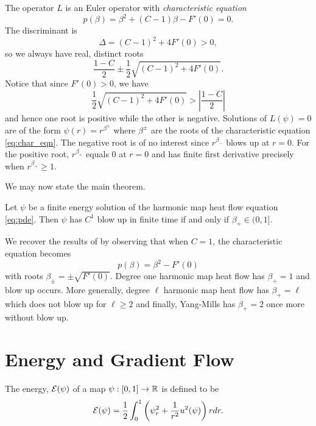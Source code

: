 \documentclass{amsart}
\begin{document}
The operator \(L\) is an Euler operator with \emph{characteristic equation}
\begin{equation}
\label{eq:char_eqn}
p(\beta) = \beta^2 + (C-1) \beta - F'(0) = 0.
\end{equation}
The discriminant is
\[
\Delta = (C-1)^2 + 4 F'(0) > 0,
\]
so we always have real, distinct roots
\[
\frac{1 - C}{2} \pm \frac{1}{2} \sqrt{(C-1)^2 + 4 F'(0)}.
\]
Notice that since \(F'(0) > 0\), we have
\[
\frac{1}{2} \sqrt{(C-1)^2 + 4 F'(0)} > \left|\frac{1-C}{2}\right|
\]
and hence one root is positive while the other is negative. Solutions of \(L(\psi) = 0\) are of the form \(\psi(r) = r^{\beta^{\pm}}\) where \(\beta^{\pm}\) are the roots of the characteristic equation \eqref{eq:char_eqn}. The negative root is of no interest since \(r^{\beta_-}\) blows up at \(r = 0\). For the positive root, \(r^{\beta_+}\) equals \(0\) at \(r = 0\) and has finite first derivative precisely when \(r^{\beta_+} \geq 1\).

We may now state the main theorem.

\begin{thm}
Let \(\psi\) be a finite energy solution of the harmonic map heat flow equation \eqref{eq:pde}. Then \(\psi\) has \(C^1\) blow up in finite time if and only if \(\beta_+ \in (0, 1]\).
\end{thm}

\begin{rem}
We recover the results of \cite{MR2332425} by observing that when \(C = 1\), the characteristic equation becomes
\[
p(\beta) = \beta^2 - F'(0)
\]
with roots \(\beta_{\pm} = \pm \sqrt{F'(0)}\). Degree one harmonic map heat flow has \(\beta_+ = 1\) and blow up occurs. More generally, degree \(\ell\) harmonic map heat flow has \(\beta_+ = \ell\) which does not blow up for \(\ell \geq 2\) and finally, Yang-Mills has \(\beta_+ = 2\) once more without blow up.
\end{rem}

\section{Energy and Gradient Flow}
\label{subsec:intro_energygradient}

\begin{defn}
\label{defn:energy}
The energy, \(\operatorname{\mathcal{E}}(\psi)\) of a map \(\psi: [0, 1] \to \mathbb{R}\) is defined to be
\[
\operatorname{\mathcal{E}}(\psi) = \frac{1}{2} \int_0^1 \left(\psi_r^2 + \frac{1}{r^2} u^2(\psi)\right) r dr.
\]
\end{defn}
\end{document}
